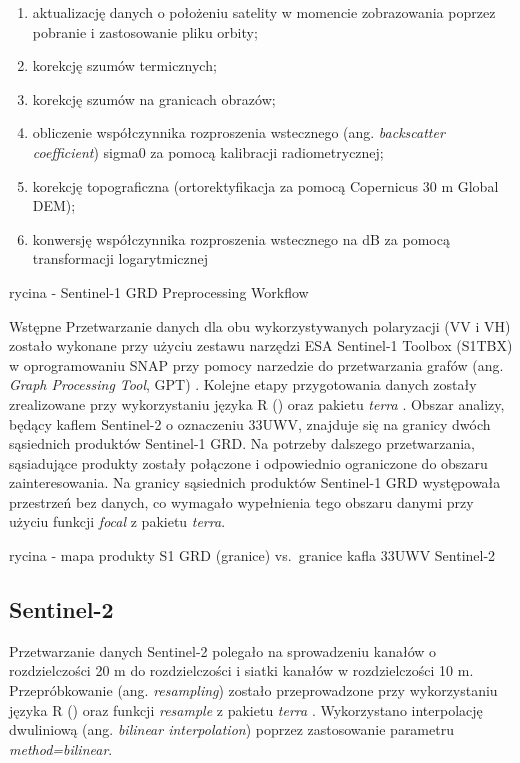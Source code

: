 \documentclass{amuthesis}
\begin{document}
\begin{enumerate}
\def\labelenumi{\arabic{enumi}.}
\item
  aktualizację danych o położeniu satelity w momencie zobrazowania
  poprzez pobranie i zastosowanie pliku orbity;
\item
  korekcję szumów termicznych;
\item
  korekcję szumów na granicach obrazów;
\item
  obliczenie współczynnika rozproszenia wstecznego (ang.
  \emph{backscatter coefficient}) sigma0 za pomocą kalibracji
  radiometrycznej;
\item
  korekcję topograficzna (ortorektyfikacja za pomocą Copernicus 30 m
  Global DEM);
\item
  konwersję współczynnika rozproszenia wstecznego na dB za pomocą
  transformacji logarytmicznej
\end{enumerate}

rycina - Sentinel-1 GRD Preprocessing Workflow

Wstępne Przetwarzanie danych dla obu wykorzystywanych polaryzacji (VV i
VH) zostało wykonane przy użyciu zestawu narzędzi ESA Sentinel-1 Toolbox
(S1TBX) \autocite{s1tbx} w oprogramowaniu SNAP \autocite{snap} przy
pomocy narzedzie do przetwarzania grafów (ang. \emph{Graph Processing
Tool}, GPT) . Kolejne etapy przygotowania danych zostały zrealizowane
przy wykorzystaniu języka R (\textcite{R-base}) oraz pakietu
\emph{terra} \autocite{R-terra}. Obszar analizy, będący kaflem
Sentinel-2 o oznaczeniu 33UWV, znajduje się na granicy dwóch sąsiednich
produktów Sentinel-1 GRD. Na potrzeby dalszego przetwarzania,
sąsiadujące produkty zostały połączone i odpowiednio ograniczone do
obszaru zainteresowania. Na granicy sąsiednich produktów Sentinel-1 GRD
występowała przestrzeń bez danych, co wymagało wypełnienia tego obszaru
danymi przy użyciu funkcji \emph{focal} z pakietu \emph{terra}.

rycina - mapa produkty S1 GRD (granice) vs.~granice kafla 33UWV
Sentinel-2

\hypertarget{sec-processing-s2}{%
\subsection{Sentinel-2}\label{sec-processing-s2}}

Przetwarzanie danych Sentinel-2 polegało na sprowadzeniu kanałów o
rozdzielczości 20 m do rozdzielczości i siatki kanałów w rozdzielczości
10 m. Przepróbkowanie (ang. \emph{resampling}) zostało przeprowadzone
przy wykorzystaniu języka R (\textcite{R-base}) oraz funkcji
\emph{resample} z pakietu \emph{terra} \autocite{R-terra}. Wykorzystano
interpolację dwuliniową (ang. \emph{bilinear interpolation}) poprzez
zastosowanie parametru \emph{method=bilinear}.
\end{document}
